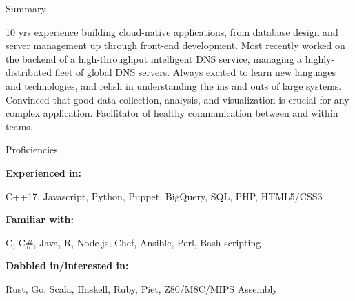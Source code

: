 \documentclass[letterpaper,12pt]{article}
\begin{document}
\begin{paracol}{2}
\begin{res_section}{Summary}
  \noindent
  \begin{minipage}{\columnwidth}
  10 yrs experience building cloud-native applications, from database design and server management up through front-end development.
  Most recently worked on the backend of a high-throughput intelligent DNS service, managing a highly-distributed fleet of
  global DNS servers. Always excited to learn new languages and technologies, and relish in understanding the ins and outs of large systems.
  Convinced that good data collection, analysis, and visualization is crucial for any complex application. Facilitator of healthy communication
  between and within teams.
  \end{minipage}
\end{res_section}
\begin{res_section}{Proficiencies}
  \begin{res_content}{\textbf{Experienced in:}}%
    \begin{sloppypar}%
    \raggedright
    \noindent%
    C++17, Javascript, Python, Puppet, BigQuery, SQL, PHP, HTML5/CSS3
    \end{sloppypar}
  \end{res_content}
  \begin{res_content}{\textbf{Familiar with:}}%
    \begin{sloppypar}%
    \raggedright
    \noindent%
    C, C\#, Java, R, Node.js, Chef, Ansible, Perl, Bash scripting
    \end{sloppypar}
  \end{res_content}
  \begin{res_content}{\textbf{Dabbled in/interested in:}}%
    \begin{sloppypar}%
    \raggedright
    \noindent%
    Rust, Go, Scala, Haskell, Ruby, Piet, Z80/M8C/MIPS Assembly
    \end{sloppypar}
  \end{res_content}


\end{res_section}
\end{paracol}
\end{document}
